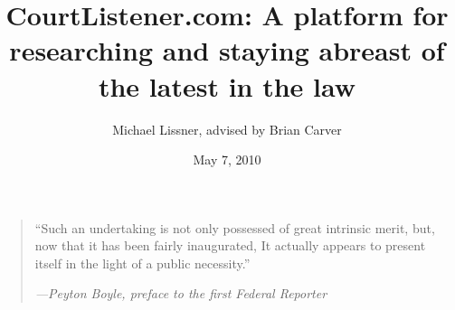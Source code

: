 \documentclass[11pt]{article}
\begin{document}
\title{CourtListener.com: A platform for researching and staying abreast of the latest in the law}

\author{Michael Lissner, advised by Brian Carver}
\date{May 7, 2010}
\maketitle
\begin{quote}
``Such an undertaking is not only possessed of great intrinsic merit, but, now that it has been fairly inaugurated, It actually appears to present itself in the light of a public necessity.''

     \hspace*{10mm}\emph{---Peyton Boyle, preface to the first Federal Reporter}
\end{quote}


\clearpage
\tableofcontents
\clearpage



\clearpage

%
%
\end{document}
